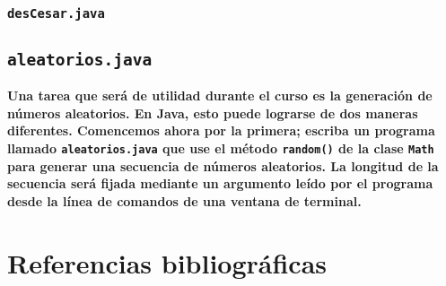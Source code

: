 \documentclass[12pt,letterpaper]{article}
\begin{document}



\subsubsection{\texttt{desCesar.java}}




\subsection{\texttt{aleatorios.java}}
\noindent
\textbf{Una tarea que será de utilidad durante el curso es la generación de números aleatorios. En Java, esto puede lograrse de dos maneras diferentes. Comencemos ahora por la primera; escriba un programa llamado \texttt{aleatorios.java} que use el método \texttt{random()} de la clase \texttt{Math} para generar una secuencia de números aleatorios. La longitud de la secuencia será fijada mediante un argumento leído por el programa desde la línea de comandos de una ventana de terminal.}



\section{Referencias bibliográficas}
\end{document}
